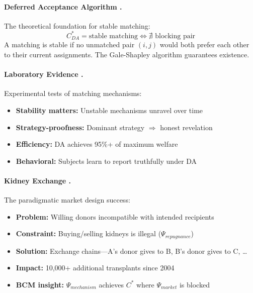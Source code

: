 \paragraph{Deferred Acceptance Algorithm \citep{gale1962college,roth1984evolution}.}
The theoretical foundation for stable matching:
\begin{equation}
C^*_{DA} = \text{stable matching} \Leftrightarrow \nexists \text{ blocking pair}
\tag{EV-DA}
\end{equation}
A matching is stable if no unmatched pair $(i, j)$ would both prefer each other
to their current assignments. The Gale-Shapley algorithm guarantees existence.

\paragraph{Laboratory Evidence \citep{roth1991game}.}
Experimental tests of matching mechanisms:
\begin{itemize}[nosep]
    \item \textbf{Stability matters:} Unstable mechanisms unravel over time
    \item \textbf{Strategy-proofness:} Dominant strategy $\Rightarrow$ honest revelation
    \item \textbf{Efficiency:} DA achieves 95\%+ of maximum welfare
    \item \textbf{Behavioral:} Subjects learn to report truthfully under DA
\end{itemize}

\paragraph{Kidney Exchange \citep{roth2004kidney,roth2007efficient}.}
The paradigmatic market design success:
\begin{itemize}[nosep]
    \item \textbf{Problem:} Willing donors incompatible with intended recipients
    \item \textbf{Constraint:} Buying/selling kidneys is illegal ($\Psi_{repugnance}$)
    \item \textbf{Solution:} Exchange chains---A's donor gives to B, B's donor gives to C, \ldots
    \item \textbf{Impact:} 10,000+ additional transplants since 2004
    \item \textbf{BCM insight:} $\Psi_{mechanism}$ achieves $C^*$ where $\Psi_{market}$ is blocked
\end{itemize}

